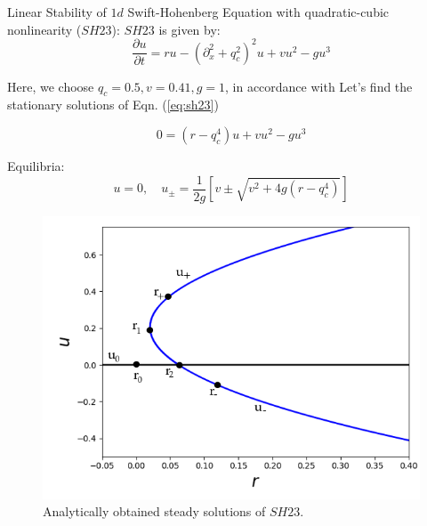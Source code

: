 \documentclass{beamer}
\begin{document}
\begin{frame}{Linear Stability of $1d$ Swift-Hohenberg Equation with quadratic-cubic nonlinearity ($SH23$):}
$SH23$ is given by:
\begin{equation} \label{eq:sh23}
\frac{\partial u}{\partial t}=
ru-(\partial^{2}_{x}+q_{c}^{2})^{2}u+vu^{2}-gu^{3}
\end{equation}

Here, we choose $q_{c} = 0.5, v = 0.41, g = 1$, in accordance with \cite{burke2007snakes}
Let's find the stationary solutions of Eqn. (\ref{eq:sh23})

\begin{equation}\label{eq:sh23_eqb}
0=   (r-q_{c}^{4})u+vu^{2}-gu^{3}
\end{equation}

\end{frame}
\begin{frame}{Equilibria:}
\begin{equation}\label{eq:sh23_eqbs}
 u = 0, \quad u_{\pm} = \frac{1}{2g}[v \pm \sqrt{v^{2} + 4g(r-q_{c}^{4})}]
\end{equation}

\begin{figure}[ht]
  \centering
  \includegraphics[scale=0.3]
  {Figs/sh.png}  
  \caption{Analytically obtained steady solutions of $SH23$.}
  \label{fig:sh}
\end{figure}
\end{frame}
\end{document}
